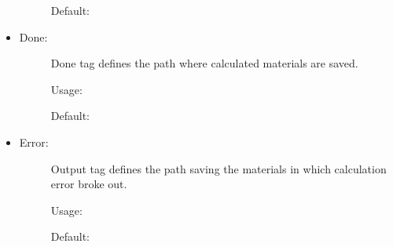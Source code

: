 \documentclass[letterpaper,10pt,english]{sphinxmanual}
\begin{document}
\begin{itemize}
\begin{description}
Default:

\begin{sphinxVerbatim}[commandchars=\\\{\}]
   
\end{sphinxVerbatim}

\end{description}

\item {} \begin{description}
\item[{Done:}] \leavevmode
Done tag defines the path where calculated materials are saved.

Usage:

\begin{sphinxVerbatim}[commandchars=\\\{\}]
   \PYG{p}{[}  \PYG{p}{]}
\end{sphinxVerbatim}

Default:

\begin{sphinxVerbatim}[commandchars=\\\{\}]
   
\end{sphinxVerbatim}

\end{description}

\item {} \begin{description}
\item[{Error:}] \leavevmode
Output tag defines the path saving the materials in which calculation error broke out.

Usage:

\begin{sphinxVerbatim}[commandchars=\\\{\}]
   \PYG{p}{[}  \PYG{p}{]}
\end{sphinxVerbatim}

Default:

\begin{sphinxVerbatim}[commandchars=\\\{\}]
   
\end{sphinxVerbatim}


\end{description}
\end{itemize}
\end{document}
